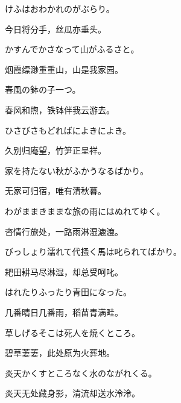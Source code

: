 \begin{haiku}
    {\FH けふはおわかれのがぶらり。}

    {\FK 今日将分手，丝瓜亦垂头。}
\end{haiku}

\begin{haiku}
    {\FH かすんでかさなって山がふるさと。}

    {\FK 烟霞缥渺重重山，山是我家园。}
\end{haiku}

\begin{haiku}
    {\FH 春風の鉢の子一つ。}

    {\FK 春风和煦，铁钵伴我云游去。}
\end{haiku}

\begin{haiku}
    {\FH ひさびさもどればによきによき。}

    {\FK 久别归庵望，竹笋正呈祥。}
\end{haiku}

\begin{haiku}
    {\FH 家を持たない秋がふかうなるばかり。}

    {\FK 无家可归宿，唯有清秋暮。}
\end{haiku}

\begin{haiku}
    {\FH わがままきままな旅の雨にはぬれてゆく。}

    {\FK 咨情行旅处，一路雨淋湿漉漉。}
\end{haiku}

\begin{haiku}
    {\FH びっしょり濡れて代掻く馬は叱られてばかり。}

    {\FK 耙田耕马尽淋湿，却总受呵叱。}
\end{haiku}

\begin{haiku}
    {\FH はれたりふったり青田になった。}

    {\FK 几番晴日几番雨，稻苗青满畦。}
\end{haiku}

\begin{haiku}
    {\FH 草しげるそこは死人を焼くところ。}

    {\FK 碧草萋萋，此处原为火葬地。}
\end{haiku}

\begin{haiku}
    {\FH 炎天かくすところなく水のながれくる。}

    {\FK 炎天无处藏身影，清流却送水泠泠。}
\end{haiku}


